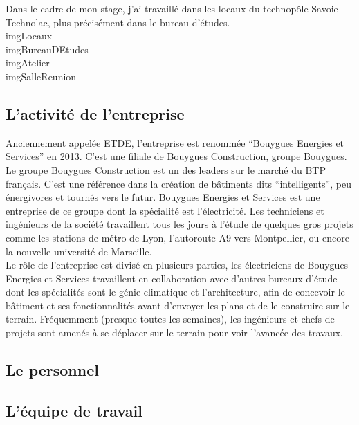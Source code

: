 \documentclass[a4paper]{article}
\begin{document}
    Dans le cadre de mon stage, j’ai travaillé dans les locaux du technopôle Savoie Technolac, plus précisément dans le bureau d’études. \\

    imgLocaux \\
    imgBureauDEtudes \\
    imgAtelier \\
    imgSalleReunion \\

    \subsection{L'activité de l'entreprise}

    Anciennement appelée ETDE, l’entreprise est renommée “Bouygues Energies et Services” en 2013. C’est une filiale de Bouygues Construction, groupe Bouygues. \\
 
    Le groupe Bouygues Construction est un des leaders sur le marché du BTP français. C’est une référence dans la création de bâtiments dits “intelligents”, peu énergivores et tournés vers le futur. Bouygues Energies et Services est une entreprise de ce groupe dont la spécialité est l’électricité. Les techniciens et ingénieurs de la société travaillent tous les jours à l’étude de quelques gros projets comme les stations de métro de Lyon, l’autoroute A9 vers Montpellier, ou encore la nouvelle université de Marseille. \\
 
    Le rôle de l’entreprise est divisé en plusieurs parties, les électriciens de Bouygues Energies et Services travaillent en collaboration avec d’autres bureaux d’étude dont les spécialités sont le génie climatique et l’architecture, afin de concevoir le bâtiment et ses fonctionnalités avant d’envoyer les plans et de le construire sur le terrain. Fréquemment (presque toutes les semaines), les ingénieurs et chefs de projets sont amenés à se déplacer sur le terrain pour voir l’avancée des travaux. \\

    \subsection{Le personnel}
    \subsection{L'équipe de travail}
    
\end{document}
